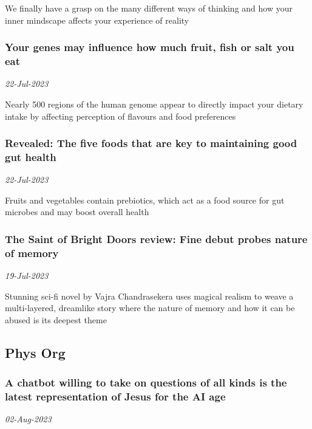 We finally have a grasp on the many different ways of thinking and how your inner mindscape affects your experience of reality
\subsubsection{Your genes may influence how much fruit, fish or salt you eat \href{https://www.newscientist.com/article/2383747-your-genes-may-influence-how-much-fruit-fish-or-salt-you-eat/?utm_campaign=RSS%7CNSNS&utm_source=NSNS&utm_medium=RSS&utm_content=home}{\ding{225}}}
\textit{22-Jul-2023}

Nearly 500 regions of the human genome appear to directly impact your dietary intake by affecting perception of flavours and food preferences
\subsubsection{Revealed: The five foods that are key to maintaining good gut health \href{https://www.newscientist.com/article/2383723-revealed-the-five-foods-that-are-key-to-maintaining-good-gut-health/?utm_campaign=RSS%7CNSNS&utm_source=NSNS&utm_medium=RSS&utm_content=home}{}}
\textit{22-Jul-2023}

Fruits and vegetables contain prebiotics, which act as a food source for gut microbes and may boost overall health
\subsubsection{The Saint of Bright Doors review: Fine debut probes nature of memory \href{https://www.newscientist.com/article/mg25934480-700-the-saint-of-bright-doors-review-fine-debut-probes-nature-of-memory/?utm_campaign=RSS%7CNSNS&utm_source=NSNS&utm_medium=RSS&utm_content=home}{\ding{225}}}
\textit{19-Jul-2023}

Stunning sci-fi novel by Vajra Chandrasekera uses magical realism to weave a multi-layered, dreamlike story where the nature of memory and how it can be abused is its deepest theme
\subsection{Phys Org \href{https://phys.org/}{}}
\subsubsection{A chatbot willing to take on questions of all kinds is the latest representation of Jesus for the AI age \href{https://phys.org/news/2023-08-chatbot-kinds-latest-representation-jesus.html}{}}
\textit{02-Aug-2023}

